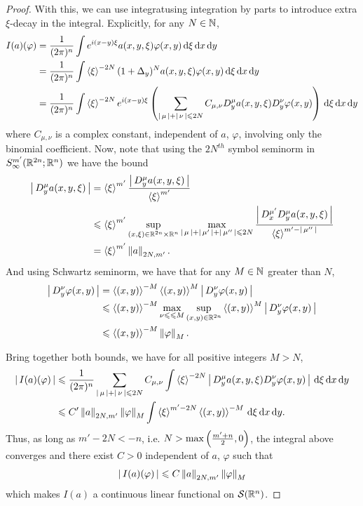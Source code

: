 \documentclass[12pt]{article}
\begin{document}
\begin{proof}
    With this, we can use integratusing integration by parts to introduce extra $\xi$-decay in the integral. Explicitly, for any $N \in \N$, 
    \begin{align*}
        I(a)(\varphi) 
        & = \frac{1}{(2\pi)^n} \int e^{i(x- y)\xi} a(x, y, \xi) \varphi(x, y) \d[\xi] \d[x] \d[y]\\
        & = \frac{1}{(2\pi)^n} \int \sym[\xi]^{-2N} (1 + \Delta_y)^N a(x, y, \xi) \varphi(x, y) \d[\xi] \d[x] \d[y]\\
        &=  \frac{1}{(2\pi)^n} \int \sym[\xi]^{-2N} e^{i (x - y) \xi } \brac{ \sum_{\abs{\mu} + \abs{\nu} \leq 2N} C_{\mu, \nu}  D^\mu_y a(x, y, \xi) D^\nu_{y} \varphi(x, y)} \d[\xi] \d[x] \d[y]\\
    \end{align*}
    where $C_{\mu, \nu}$ is a complex constant, independent of $a$, $\varphi$, involving only the binomial coefficient. Now, note that using the $2N^{th}$ symbol seminorm in $S^{m'}_{\infty}(\R^{2n}; \R^{n})$ we have the bound
    \begin{align*}
    \abs{D^\mu_y a(x, y, \xi)} 
    &= \sym[\xi]^{m' } \frac{\abs{D^\mu_y a(x, y, \xi)}}{\sym[\xi]^{m'}} \\
    & \leq \sym[\xi]^{m'} \sup_{(x, \xi) \in \R^{2n} \times \R^n} \max_{\abs{\mu} + \abs{\mu'} + \abs{\mu''} \leq 2N} \frac{\abs{D^{\mu'}_x D^\mu_y a(x, y, \xi)}}{\sym[\xi]^{m' - \abs{\mu''}}} \\
    & = \sym[\xi]^{m'} \norm[a]_{2N,m'}. 
    \end{align*}
    And using Schwartz seminorm, we have that for any $M \in \N$ greater than $N$,  
    \begin{align*}
    \abs{D^\nu_y \varphi(x, y)} 
    &= \sym[(x, y)]^{- M} \sym[(x, y)]^{M} \abs{D^{\nu}_{y} \varphi(x,y)} \\
    & \leq  \sym[(x, y)]^{- M} \max_{\nu{\leq} \leq M} \sup_{(x, y) \in \R^{2n}} \sym[(x, y)]^{M} \abs{D^{\nu}_{y} \varphi(x,y)}\\
    & \leq \sym[(x, y)]^{-M} \norm[\varphi]_{M}. 
    \end{align*}

    Bring together both bounds, we have for all positive integers $M > N$, 
    \begin{align*}
        \abs{I(a)(\varphi)} 
        & \leq  \frac{1}{(2\pi)^n} \sum_{\abs{\mu} + \abs{\nu} \leq 2N} C_{\mu, \nu}  \int \sym[\xi]^{-2N} \abs{ D^\mu_y a(x, y, \xi) D^\nu_{y} \varphi(x, y)} \d[\xi] \d[x] \d[y]\\
        & \leq  C' \norm[a]_{2N,m'} \norm[\varphi]_{M}  \int \sym[\xi]^{m ' -2N} \sym[(x, y)]^{-M}  \d[\xi] \d[x] \d[y]. \\
    \end{align*}
    Thus, as long as $m' - 2N < -n$, i.e. $N > \max\brac{\frac{m' + n}{2}, 0}$, the integral above converges and there exist $C > 0$ independent of $a$, $\varphi$ such that   
    \begin{align*}
        \abs{I(a)(\varphi)} \leq C \norm[a]_{2N, m'}\norm[\varphi]_{M} 
    \end{align*}
    which makes $I(a)$ a continuous linear functional on $\sch(\R^n)$. 
\end{proof}
\end{document}
